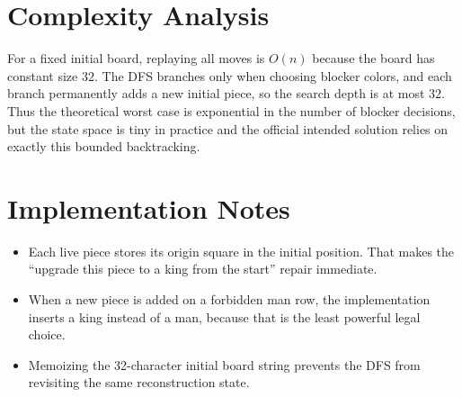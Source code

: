 \documentclass[11pt]{article}
\begin{document}
\section*{Complexity Analysis}

For a fixed initial board, replaying all moves is $O(n)$ because the board has constant size $32$. The DFS branches only when choosing blocker colors, and each branch permanently adds a new initial piece, so the search depth is at most $32$. Thus the theoretical worst case is exponential in the number of blocker decisions, but the state space is tiny in practice and the official intended solution relies on exactly this bounded backtracking.

\section*{Implementation Notes}

\begin{itemize}[leftmargin=*]
    \item Each live piece stores its origin square in the initial position. That makes the ``upgrade this piece to a king from the start'' repair immediate.
    \item When a new piece is added on a forbidden man row, the implementation inserts a king instead of a man, because that is the least powerful legal choice.
    \item Memoizing the 32-character initial board string prevents the DFS from revisiting the same reconstruction state.
\end{itemize}
\end{document}
